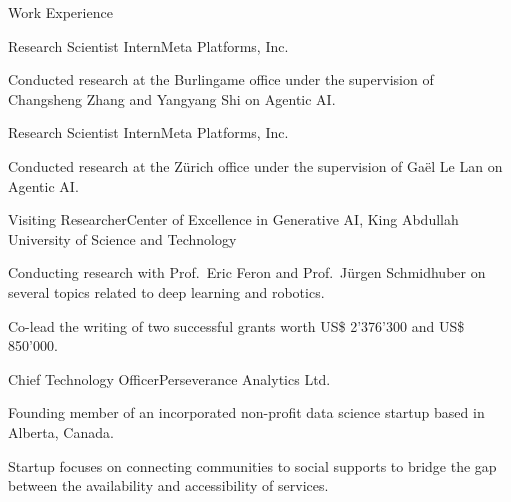 \documentclass[a4paper,dateabbrev]{cv}
\begin{document}
\begin{rSection}{Work Experience}

\begin{rSubsection}{Research Scientist Intern}{}{Meta Platforms, Inc.}
    \item Conducted research at the Burlingame office under the supervision of Changsheng Zhang and Yangyang Shi on Agentic AI.
\end{rSubsection}

\begin{rSubsection}{Research Scientist Intern}{}{Meta Platforms, Inc.}
    \item Conducted research at the Z{\"u}rich office under the supervision of Ga{\"e}l Le Lan on Agentic AI.
\end{rSubsection}

\begin{rSubsection}{Visiting Researcher}{}{Center of Excellence in Generative AI, King Abdullah University of Science and Technology}
    \item Conducting research with Prof.\ Eric Feron and Prof.\ J{\"{u}}rgen Schmidhuber on several topics related to deep learning and robotics.
    \item Co-lead the writing of two successful grants worth US\$ 2'376'300 and US\$ 850'000.
\end{rSubsection}

\begin{rSubsection}{Chief Technology Officer}{}{Perseverance Analytics Ltd.}
    \item Founding member of an incorporated non-profit data science startup based in Alberta, Canada.
    \item Startup focuses on connecting communities to social supports to bridge the gap between the availability and accessibility of services.
\end{rSubsection}


\end{rSection}
\end{document}
